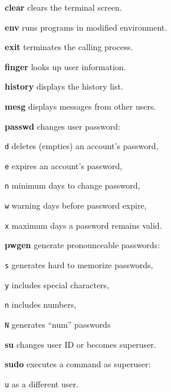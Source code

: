 \begin{compactenum}
	\item [\cmdvar] \textbf{clear} clears the terminal screen.
	\item [\cmdvar] \textbf{env} runs programs in modified environment.
	\item [\cmdvar] \textbf{exit} terminates the calling process.
	\item [\cmdvar] \textbf{finger} looks up user information.
	\item [\cmdvar] \textbf{history}  displays the history list. %
	\item [\cmdvar] \textbf{mesg} displays messages from other users.
\end{compactenum}

\begin{compactenum}
	\item [\cmdvar] \textbf{passwd} changes user password:
	\item [\texttt{d}] deletes (empties) an account's password,
	\item [\texttt{e}] expires an account's password,
	\item [\texttt{n}] minimum days to change password,
	\item [\texttt{w}] warning days before password expire,
	\item [\texttt{x}] maximum days a password remains valid.
	\item [\cmdvar] \textbf{pwgen} generate pronounceable passwords:
	\item [\texttt{s}] generates hard to memorize passwords,
	\item [\texttt{y}] includes special characters,
	\item [\texttt{n}] includes numbers,
	\item [\texttt{N}] generates ``num'' passwords
\end{compactenum}

\begin{compactenum}
        \item [\cmdutil] \textbf{su} changes user ID or becomes superuser.
        \item [\cmdvar] \textbf{sudo} executes a command as superuser:
        \item [\texttt{u}] as a different user.
\end{compactenum}

